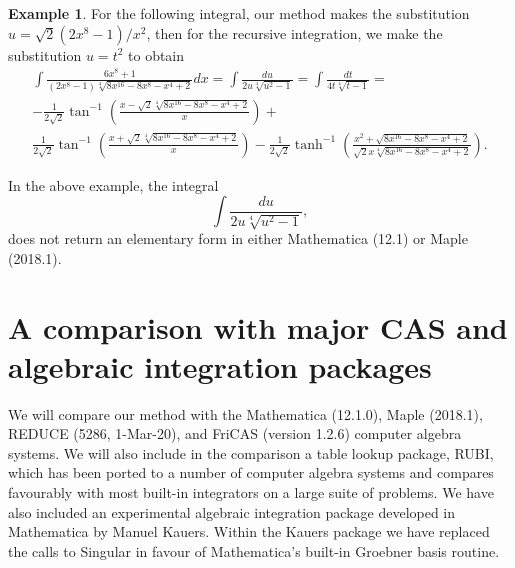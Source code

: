 \documentclass[12pt]{article}
\numberwithin{equation}{section}
\theoremstyle{definition}
\newtheorem{example}{Example}[section]
\begin{document}
\begin{example}
For the following integral, our method makes the substitution 
$u = \sqrt{2}\left(2x^8-1\right)/x^2$, then for the recursive integration, we make 
the substitution $u = t^2$ to obtain 
\begin{multline*}
\int \frac{6 x^8+1}{\left(2 x^8-1\right) \sqrt[4]{8 x^{16}-8 x^8-x^4+2}} dx =
 \int\frac{du}{2 u \sqrt[4]{u^2-1}} = \int \frac{dt}{4 t \sqrt[4]{t-1}} = \\
 -\frac{1}{2\sqrt{2}} \tan ^{-1}\left(\frac{x-\sqrt{2} \sqrt[4]{8 x^{16}-8 x^8-x^4+2}}{x}\right) + \\
 \frac{1}{2\sqrt{2}} \tan ^{-1}\left(\frac{x+\sqrt{2} \sqrt[4]{8 x^{16}-8 x^8-x^4+2}}{x}\right) - 
 \frac{1}{2 \sqrt{2}} \tanh ^{-1}\left(\frac{x^2+\sqrt{8 x^{16}-8 x^8-x^4+2}}{\sqrt{2} x \sqrt[4]{8x^{16}-8 x^8-x^4+2}}\right).
\end{multline*}
\end{example}

In the above example, the integral $$\int\frac{du}{2 u \sqrt[4]{u^2-1}},$$ does not return an elementary 
form in either Mathematica (12.1) or Maple (2018.1).

\section{A comparison with major CAS and algebraic integration packages}

We will compare our method with the Mathematica (12.1.0), Maple (2018.1), REDUCE (5286, 1-Mar-20), 
and FriCAS (version 1.2.6) computer algebra systems. We will also include in the comparison a table 
lookup package, RUBI\cite{Rich2018}, which has been ported to a number of computer algebra systems 
and compares favourably with most built-in integrators on a large suite of problems\cite{rubi_results}. 
We have also included an experimental algebraic integration package developed in Mathematica by Manuel 
Kauers\cite{Kauers2008}. Within the Kauers package we have replaced the calls to Singular in favour
of Mathematica's built-in Groebner basis routine.\\
\end{document}
